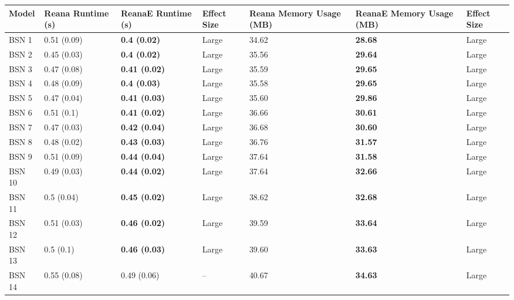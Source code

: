 \begin{tabular}{lllllll}
\toprule
  Model & Reana Runtime (s) &    ReanaE Runtime (s) & Effect Size & Reana Memory Usage (MB) & ReanaE Memory Usage (MB) & Effect Size \\
\midrule
  BSN 1 &       0.51 (0.09) &   \textbf{0.4 (0.02)} &       Large &                   34.62 &           \textbf{28.68} &       Large \\
  BSN 2 &       0.45 (0.03) &   \textbf{0.4 (0.02)} &       Large &                   35.56 &           \textbf{29.64} &       Large \\
  BSN 3 &       0.47 (0.08) &  \textbf{0.41 (0.02)} &       Large &                   35.59 &           \textbf{29.65} &       Large \\
  BSN 4 &       0.48 (0.09) &   \textbf{0.4 (0.03)} &       Large &                   35.58 &           \textbf{29.65} &       Large \\
  BSN 5 &       0.47 (0.04) &  \textbf{0.41 (0.03)} &       Large &                   35.60 &           \textbf{29.86} &       Large \\
  BSN 6 &        0.51 (0.1) &  \textbf{0.41 (0.02)} &       Large &                   36.66 &           \textbf{30.61} &       Large \\
  BSN 7 &       0.47 (0.03) &  \textbf{0.42 (0.04)} &       Large &                   36.68 &           \textbf{30.60} &       Large \\
  BSN 8 &       0.48 (0.02) &  \textbf{0.43 (0.03)} &       Large &                   36.76 &           \textbf{31.57} &       Large \\
  BSN 9 &       0.51 (0.09) &  \textbf{0.44 (0.04)} &       Large &                   37.64 &           \textbf{31.58} &       Large \\
 BSN 10 &       0.49 (0.03) &  \textbf{0.44 (0.02)} &       Large &                   37.64 &           \textbf{32.66} &       Large \\
 BSN 11 &        0.5 (0.04) &  \textbf{0.45 (0.02)} &       Large &                   38.62 &           \textbf{32.68} &       Large \\
 BSN 12 &       0.51 (0.03) &  \textbf{0.46 (0.02)} &       Large &                   39.59 &           \textbf{33.64} &       Large \\
 BSN 13 &         0.5 (0.1) &  \textbf{0.46 (0.03)} &       Large &                   39.60 &           \textbf{33.63} &       Large \\
 BSN 14 &       0.55 (0.08) &           0.49 (0.06) &          -- &                   40.67 &           \textbf{34.63} &       Large \\

\end{tabular}

